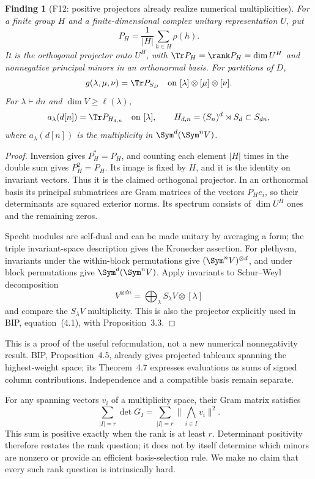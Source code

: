 \documentclass[11pt,a4paper]{article}
\newcommand{\fid}[1]{\textsf{#1}}\newcommand{\gate}[1]{\textsf{#1}}
\theoremstyle{named}\newtheorem{finding}{Finding}[section]
\theoremstyle{definition}\newtheorem{definition}[finding]{Definition}
\theoremstyle{remark}\newtheorem{remark}[finding]{Remark}
\begin{document}
\begin{finding}[\fid{F12}: positive projectors already realize numerical multiplicities]\label{f:projector}
For a finite group $H$ and a finite-dimensional complex unitary representation $U$, put
\[
 P_H=\frac1{|H|}\sum_{h\in H}\rho(h).
\]
It is the orthogonal projector onto $U^H$, with $\Tr P_H=\rank P_H=\dim U^H$ and nonnegative principal minors in an orthonormal basis. For partitions of $D$,
\[
 g(\lambda,\mu,\nu)=\Tr P_{S_D}
 \quad\text{on }[\lambda]\otimes[\mu]\otimes[\nu].
\]
For $\lambda\vdash dn$ and $\dim V\ge\ell(\lambda)$,
\[
 a_\lambda(d[n])=\Tr P_{H_{d,n}}\quad\text{on }[\lambda],\qquad
 H_{d,n}=(S_n)^d\rtimes S_d\subset S_{dn},
\]
where $a_\lambda(d[n])$ is the multiplicity in $\Sym^d(\Sym^nV)$.
\end{finding}
\begin{proof}
Inversion gives $P_H^*=P_H$, and counting each element $|H|$ times in the double sum gives $P_H^2=P_H$. Its image is fixed by $H$, and it is the identity on invariant vectors. Thus it is the claimed orthogonal projector. In an orthonormal basis its principal submatrices are Gram matrices of the vectors $P_He_i$, so their determinants are squared exterior norms. Its spectrum consists of $\dim U^H$ ones and the remaining zeros.

Specht modules are self-dual and can be made unitary by averaging a form; the triple invariant-space description gives the Kronecker assertion. For plethysm, invariants under the within-block permutations give $(\Sym^n V)^{\otimes d}$, and under block permutations give $\Sym^d(\Sym^nV)$. Apply invariants to Schur--Weyl decomposition
\[
 V^{\otimes dn}=\bigoplus_\lambda S_\lambda V\otimes[\lambda]
\]
and compare the $S_\lambda V$ multiplicity. This is also the projector explicitly used in BIP, equation~(4.1), with Proposition~3.3.
\end{proof}
This is a proof of the useful reformulation, not a new numerical nonnegativity result. BIP, Proposition~4.5, already gives projected tableaux spanning the highest-weight space; its Theorem~4.7 expresses evaluations as sums of signed column contributions. Independence and a compatible basis remain separate.

For any spanning vectors $v_i$ of a multiplicity space, their Gram matrix satisfies
\[
 \sum_{|I|=r}\det G_I=\sum_{|I|=r}\bigl\|\bigwedge_{i\in I}v_i\bigr\|^2.
\]
This sum is positive exactly when the rank is at least $r$. Determinant positivity therefore restates the rank question; it does not by itself determine which minors are nonzero or provide an efficient basis-selection rule. We make no claim that every such rank question is intrinsically hard.
\end{document}
